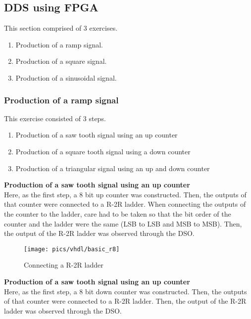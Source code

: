 \pagebreak

\subsection{DDS using FPGA}

This section comprised of 3 exercises.
\begin{enumerate}
	\item Production of a ramp signal.
	\item Production of a square signal.
	\item Production of a sinusoidal signal.
\end{enumerate}

\subsubsection{Production of a ramp signal}

\noindent
This exercise consisted of 3 steps.
\begin{enumerate}
	\item Production of a saw tooth signal using an up counter
	\item Production of a square tooth signal using a down counter
	\item Production of a triangular signal using an up and down counter
\end{enumerate}

\noindent
\textbf{Production of a saw tooth signal using an up counter}\\

\noindent
Here, as the first step, a 8 bit up counter was constructed. Then, the outputs of that counter were connected to a R-2R ladder. When connecting the outputs of the counter to the ladder, care had to be taken so that the bit order of the  counter and the ladder were the same (LSB to LSB and MSB to MSB). Then, the output of the  R-2R ladder was observed through the DSO.\\

\begin{figure}[!h]
	\centering
	\texttt{[image: pics/vhdl/basic\_r8]}
	\caption{Connecting a R-2R ladder}
	\label{fig:basicr8}
\end{figure}

\noindent
\textbf{Production of a saw tooth signal using an up counter}\\

\noindent
Here, as the first step, a 8 bit down counter was constructed. Then, the outputs of that counter were connected to a R-2R ladder. Then, the output of the  R-2R ladder was observed through the DSO.\\



